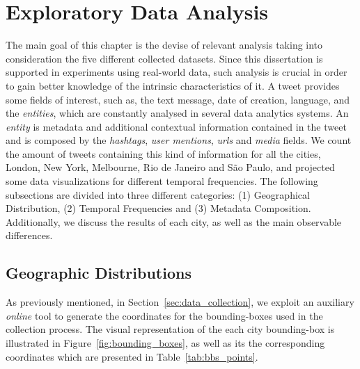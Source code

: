 \chapter{Exploratory Data Analysis}
\label{chap:exploratory_data_analysis}

\minitoc \mtcskip \noindent

The main goal of this chapter is the devise of relevant analysis taking into consideration the five different collected datasets. Since this dissertation is supported in experiments using real-world data, such analysis is crucial in order to gain better knowledge of the intrinsic characteristics of it. A tweet provides some fields of interest, such as, the text message, date of creation, language, and the \emph{entities}, which are constantly analysed in several data analytics systems. An \emph{entity} is metadata and additional contextual information contained in the tweet and is composed by the \emph{hashtags}, \emph{user mentions}, \emph{urls} and \emph{media} fields. We count the amount of tweets containing this kind of information for all the cities, London, New York, Melbourne, Rio de Janeiro and São Paulo, and projected some data visualizations for different temporal frequencies. The following subsections are divided into three different categories:  (1) Geographical Distribution, (2) Temporal Frequencies and (3) Metadata Composition. Additionally, we discuss the results of each city, as well as the main observable differences.

\section{Geographic Distributions}\label{sec:geographical_distribution}

As previously mentioned, in Section~\ref{sec:data_collection}, we exploit an auxiliary \textit{online} tool to generate the coordinates for the bounding-boxes used in the collection process. The visual representation of the each city bounding-box is illustrated in Figure~\ref{fig:bounding_boxes}, as well as its the corresponding coordinates which are presented in Table~\ref{tab:bbs_points}.

